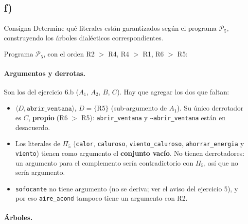 \documentclass[11pt,a4paper]{article}
\newcommand{\nf}{\textasciitilde}                 %
\begin{document}
\subsection{f)}

\begin{enunciado}{Consigna}
Determine qué literales están garantizados según el programa $\mathcal{P}_5$, construyendo los árboles dialécticos correspondientes.
\end{enunciado}

Programa $\mathcal{P}_5$, con el orden R2 $>$ R4, R4 $>$ R1, R6 $>$ R5:
\programaPcinco
\reglasPcinco

\paragraph{Argumentos y derrotas.} Son los del ejercicio 6.b ($A_1$, $A_2$, $B$, $C$). Hay que agregar los dos que faltan:
\begin{itemize}
  \item $\langle D, \texttt{abrir\_ventana}\rangle$, $D = \{$R5$\}$ (sub-argumento de $A_1$). Su único derrotador es $C$, \textbf{propio} (R6 $>$ R5): \texttt{abrir\_ventana} y \texttt{\nf abrir\_ventana} están en desacuerdo.
  \item Los literales de $\Pi_5$ (\texttt{calor}, \texttt{caluroso}, \texttt{viento\_caluroso}, \texttt{ahorrar\_energia} y \texttt{viento}) tienen como argumento el \textbf{conjunto vacío}. No tienen derrotadores: un argumento para el complemento sería contradictorio con $\Pi_5$, así que no sería argumento.
  \item \texttt{sofocante} no tiene argumento (no se deriva; ver el aviso del ejercicio 5), y por eso \texttt{aire\_acond} tampoco tiene un argumento con R2.
\end{itemize}

\paragraph{Árboles.}
\end{document}
